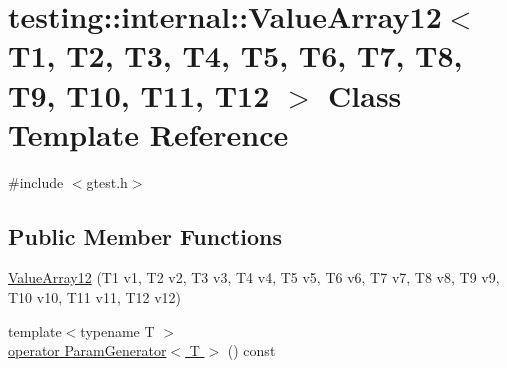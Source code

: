 \hypertarget{classtesting_1_1internal_1_1_value_array12}{\section{testing\-:\-:internal\-:\-:Value\-Array12$<$ T1, T2, T3, T4, T5, T6, T7, T8, T9, T10, T11, T12 $>$ Class Template Reference}
\label{classtesting_1_1internal_1_1_value_array12}
}


{\ttfamily \#include $<$gtest.\-h$>$}

\subsection*{Public Member Functions}
\begin{DoxyCompactItemize}
\item 
\hyperlink{classtesting_1_1internal_1_1_value_array12_aaebe12df41b8122fd03f5d6aa1c820a7}{Value\-Array12} (T1 v1, T2 v2, T3 v3, T4 v4, T5 v5, T6 v6, T7 v7, T8 v8, T9 v9, T10 v10, T11 v11, T12 v12)
\item 
{\footnotesize template$<$typename T $>$ }\\\hyperlink{classtesting_1_1internal_1_1_value_array12_aba607bff7adc38033e09ca8be6a0daee}{operator Param\-Generator$<$ T $>$} () const 
\end{DoxyCompactItemize}


